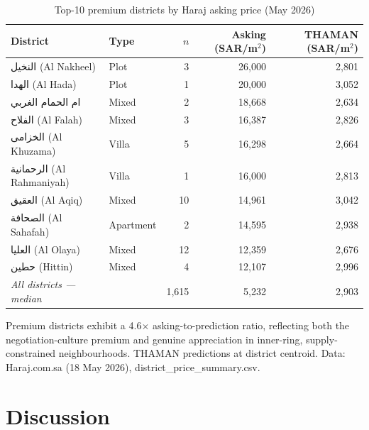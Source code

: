 \documentclass[11pt, a4paper, twoside]{article}
\begin{document}
\begin{table}[H]
  \centering
  \caption{Top-10 premium districts by Haraj asking price (May 2026)}
  \label{tab:haraj_premium}
  \begin{tabular}{llrrr}
    \toprule
    District & Type & $n$ & Asking (SAR/m$^2$) & THAMAN (SAR/m$^2$) \\
    \midrule
    النخيل (Al Nakheel)       & Plot      & 3  & 26,000 & 2,801 \\
    الهدا (Al Hada)           & Plot      & 1  & 20,000 & 3,052 \\
    ام الحمام الغربي          & Mixed     & 2  & 18,668 & 2,634 \\
    الفلاح (Al Falah)         & Mixed     & 3  & 16,387 & 2,826 \\
    الخزامى (Al Khuzama)      & Villa     & 5  & 16,298 & 2,664 \\
    الرحمانية (Al Rahmaniyah) & Villa     & 1  & 16,000 & 2,813 \\
    العقيق (Al Aqiq)          & Mixed     & 10 & 14,961 & 3,042 \\
    الصحافة (Al Sahafah)      & Apartment & 2  & 14,595 & 2,938 \\
    العليا (Al Olaya)         & Mixed     & 12 & 12,359 & 2,676 \\
    حطين (Hittin)             & Mixed     & 4  & 12,107 & 2,996 \\
    \midrule
    \textit{All districts --- median} & & 1,615 & 5,232 & 2,903 \\
    \bottomrule
  \end{tabular}
  \par\smallskip\small Premium districts exhibit a 4.6$\times$ asking-to-prediction
  ratio, reflecting both the negotiation-culture premium and genuine
  appreciation in inner-ring, supply-constrained neighbourhoods.
  THAMAN predictions at district centroid. Data: Haraj.com.sa (18 May 2026),
  district\_price\_summary.csv.
\end{table}

\section{Discussion}
\label{sec:discussion}
\end{document}
